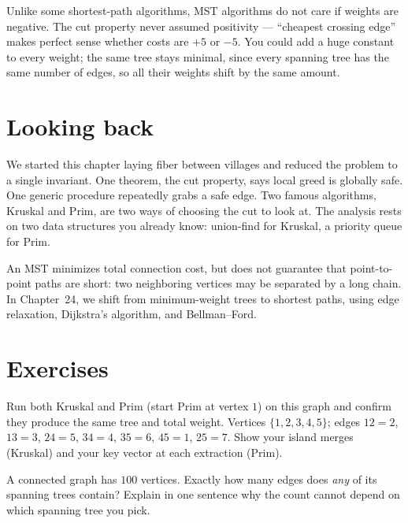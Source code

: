 \begin{remark}
Unlike some shortest-path algorithms, MST algorithms do not care if weights are
negative. The cut property never assumed positivity --- ``cheapest crossing
edge'' makes perfect sense whether costs are $+5$ or $-5$. You could add a huge
constant to every weight; the same tree stays minimal, since every spanning tree
has the same number of edges, so all their weights shift by the same amount.
\end{remark}

\section*{Looking back}

We started this chapter laying fiber between villages and reduced the problem
to a single invariant. One
theorem, the cut property, says local greed is globally safe. One generic
procedure repeatedly grabs a safe edge. Two famous algorithms, Kruskal and Prim,
are two ways of choosing the cut to look at. The analysis rests on
two data structures you already know: union-find for Kruskal, a priority queue for
Prim.

An MST minimizes total connection cost, but does not guarantee that point-to-point paths are short: two neighboring vertices may be separated by a long chain. In Chapter~24, we shift from minimum-weight trees to shortest paths, using edge relaxation, Dijkstra's algorithm, and Bellman--Ford.

\section{Exercises}

\begin{exercise}\label{ch23:ex-byhand}
Run both Kruskal and Prim (start Prim at vertex $1$) on this graph and confirm
they produce the same tree and total weight. Vertices $\{1,2,3,4,5\}$; edges
$12{=}2$, $13{=}3$, $24{=}5$, $34{=}4$, $35{=}6$, $45{=}1$, $25{=}7$. Show your
island merges (Kruskal) and your key vector at each extraction (Prim).
\end{exercise}

\begin{exercise}\label{ch23:ex-count}
A connected graph has $100$ vertices. Exactly how many edges does \emph{any} of
its spanning trees contain? Explain in one sentence why the count cannot depend
on which spanning tree you pick.
\end{exercise}

